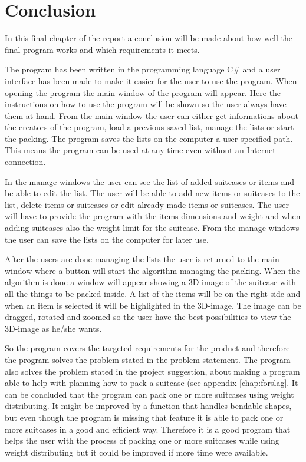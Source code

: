 \chapter{Conclusion}
In this final chapter of the report a conclusion will be made about how well the final program works and which requirements it meets.

The program has been written in the programming language C\# and a user interface has been made to make it easier for the user to use the program. When opening the program the main window of the program will appear. Here the instructions on how to use the program will be shown so the user always have them at hand. From the main window the user can either get informations about the creators of the program, load a previous saved list, manage the lists or start the packing. The program saves the lists on the computer a user specified path. This means the program can be used at any time even without an Internet connection. 

In the manage windows the user can see the list of added suitcases or items and be able to edit the list. The user will be able to add new items or suitcases to the list, delete items or suitcases or edit already made items or suitcases. The user will have to provide the program with the items dimensions and weight and when adding suitcases also the weight limit for the suitcase. From the manage windows the user can save the lists on the computer for later use. 

After the users are done managing the lists the user is returned to the main window where a button will start the algorithm managing the packing. When the algorithm is done a window will appear showing a 3D-image of the suitcase with all the things to be packed inside. A list of the items will be on the right side and when an item is selected it will be highlighted in the 3D-image. The image can be dragged, rotated and zoomed so the user have the best possibilities to view the 3D-image as he/she wants.

So the program covers the targeted requirements for the product and therefore the program solves the problem stated in the problem statement. The program also solves the problem stated in the project suggestion, about making a program able to help with planning how to pack a suitcase (see appendix \ref{chap:forslag}. It can be concluded that the program can pack one or more suitcases using weight distributing. It might be improved by a function that handles bendable shapes, but even though the program is missing that feature it is able to pack one or more suitcases in a good and efficient way. Therefore it is a good program that helps the user with the process of packing one or more suitcases while using weight distributing but it could be improved if more time were available. 